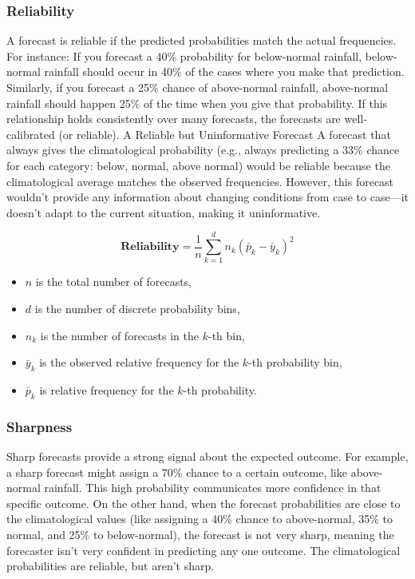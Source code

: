		\subsubsection{Reliability}

A forecast is reliable if the predicted probabilities match the actual frequencies. For instance:
If you forecast a 40\% probability for below-normal rainfall, below-normal rainfall should occur in 40\% of the cases where you make that prediction.
Similarly, if you forecast a 25\% chance of above-normal rainfall, above-normal rainfall should happen 25\% of the time when you give that probability.
If this relationship holds consistently over many forecasts, the forecasts are well-calibrated (or reliable).
A Reliable but Uninformative Forecast
A forecast that always gives the climatological probability (e.g., always predicting a 33\% chance for each category: below, normal, above normal) would be reliable because the climatological average matches the observed frequencies. However, this forecast wouldn’t provide any information about changing conditions from case to case—it doesn’t adapt to the current situation, making it uninformative.

\begin{equation}
\textbf{Reliability} = \frac{1}{n} \sum_{k=1}^{d} n_k \left( \bar{p}_k - \bar{y}_k \right)^2
\end{equation}


\begin{itemize}
    \item $n$ is the total number of forecasts,
    \item $d$ is the number of discrete probability bins,
    \item $n_k$ is the number of forecasts in the $k$-th bin,
    \item $\bar{y}_k$ is the observed relative frequency for the $k$-th probability bin,
    \item $\bar{p}_k$ is relative frequency for the $k$-th probability.
\end{itemize}


		\subsubsection{Sharpness}
Sharp forecasts provide a strong signal about the expected outcome. For example, a sharp forecast might assign a 70\% chance to a certain outcome, like above-normal rainfall. This high probability communicates more confidence in that specific outcome.
On the other hand, when the forecast probabilities are close to the climatological values (like assigning a 40\% chance to above-normal, 35\% to normal, and 25\% to below-normal), the forecast is not very sharp, meaning the forecaster isn't very confident in predicting any one outcome.
The climatological probabilities are reliable, but aren’t sharp.
